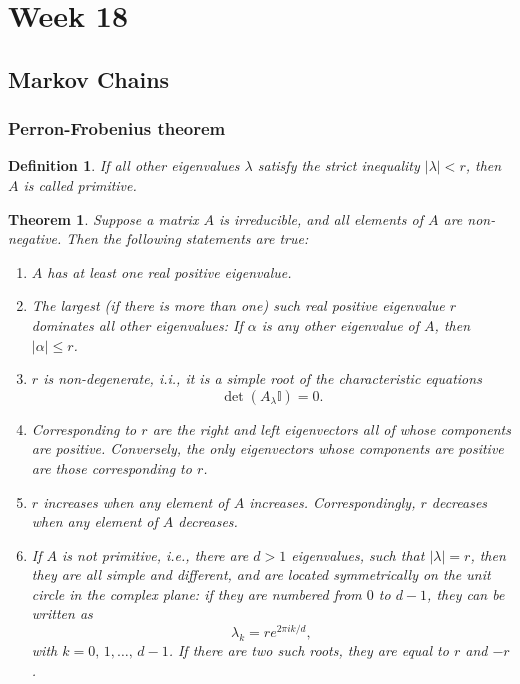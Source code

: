 \documentclass{article}
\newtheorem{theorem}{Theorem}
\newtheorem{definition}{Definition}
\begin{document}
\section{Week 18}
\subsection{Markov Chains}
\subsubsection{Perron-Frobenius theorem}
\begin{definition}
    If all other eigenvalues $\lambda$ satisfy the strict inequality $\vert\lambda\vert<r$, then $A$ is called primitive.
\end{definition}
\begin{theorem}
    Suppose a matrix $A$ is irreducible, and all elements of $A$ are non-negative. Then the following statements are true:
    \begin{enumerate}
        \item $A$ has at least one real positive eigenvalue.
        \item The largest (if there is more than one) such real positive eigenvalue $r$ dominates all other eigenvalues: If $\alpha$ is any other eigenvalue of $A$, then $\vert\alpha\vert\leq r$.
        \item $r$ is non-degenerate, i.i., it is a simple root of the characteristic equations
        \begin{equation}
            \det(A_\lambda\mathbb{I})=0.
        \end{equation} \nonumber
        \item Corresponding to $r$ are the right and left eigenvectors all of whose components are positive. Conversely, the only eigenvectors whose components are positive are those corresponding to $r$.
        \item $r$ increases when any element of $A$ increases. Correspondingly, $r$ decreases when any element of $A$ decreases.
        \item If $A$ is not primitive, i.e., there are $d>1$ eigenvalues, such that $\vert\lambda\vert=r$, then they are all simple and different, and are located symmetrically on the unit circle in the complex plane: if they are numbered from $0$ to $d-1$, they can be written as
        \begin{equation}
            \lambda_k = re^{2\pi ik/d},
        \end{equation}
        with $k = 0,\,1,\ldots,\,d-1$. If there are two such roots, they are equal to $r$ and $-r$.\\

\end{enumerate}
\end{theorem}
\end{document}
